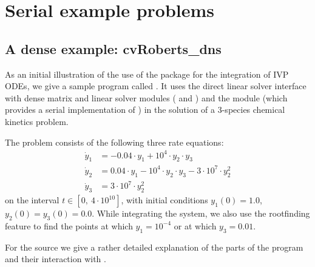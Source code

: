 \section{Serial example problems}\label{s:ex_serial}

\subsection{A dense example: cvRoberts\_dns}\label{ss:cvRoberts}

As an initial illustration of the use of the {\cvode} package for the
integration of IVP ODEs, we give a sample program called .
It uses the {\cvode} direct linear solver interface {\cvdls} with
dense matrix and linear solver modules ({\sunmatdense} and {\sunlinsoldense})
and the {\nvecs} module (which provides a serial implementation of {\nvector})
in the solution of a 3-species chemical kinetics problem.

The problem consists of the following three rate equations:
\vspace*{-.08in}
\begin{equation}
  \begin{split}
    \dot{y}_1 &= -0.04 \cdot y_1 + 10^4 \cdot y_2 \cdot y_3 \\
    \dot{y}_2 &=  0.04 \cdot y_1 - 10^4 \cdot y_2 \cdot y_3
                                  - 3 \cdot 10^7 \cdot y_2^2 \\
    \dot{y}_3 &=  3 \cdot 10^7 \cdot y_2^2
  \end{split} 
\end{equation}
on the interval $t \in [0, ~4 \cdot 10^{10}]$, with initial conditions
$y_1(0) = 1.0$, $y_2(0) = y_3(0) = 0.0$.
While integrating the system, we also use the rootfinding
feature to find the points at which $y_1 = 10^{-4}$ or at which
$y_3 = 0.01$.

For the source we give a rather detailed explanation of the parts of the program and
their interaction with {\cvode}.

